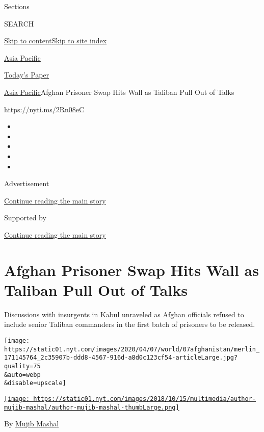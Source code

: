 Sections

SEARCH

\protect\hyperlink{site-content}{Skip to
content}\protect\hyperlink{site-index}{Skip to site index}

\href{https://www.nytimes.com/section/world/asia}{Asia Pacific}

\href{https://myaccount.nytimes.com/auth/login?response_type=cookie\&client_id=vi}{}

\href{https://www.nytimes.com/section/todayspaper}{Today's Paper}

\href{/section/world/asia}{Asia Pacific}\textbar{}Afghan Prisoner Swap
Hits Wall as Taliban Pull Out of Talks

\url{https://nyti.ms/2Rn08eC}

\begin{itemize}
\item
\item
\item
\item
\item
\end{itemize}

Advertisement

\protect\hyperlink{after-top}{Continue reading the main story}

Supported by

\protect\hyperlink{after-sponsor}{Continue reading the main story}

\hypertarget{afghan-prisoner-swap-hits-wall-as-taliban-pull-out-of-talks}{%
\section{Afghan Prisoner Swap Hits Wall as Taliban Pull Out of
Talks}\label{afghan-prisoner-swap-hits-wall-as-taliban-pull-out-of-talks}}

Discussions with insurgents in Kabul unraveled as Afghan officials
refused to include senior Taliban commanders in the first batch of
prisoners to be released.

\texttt{[image: https://static01.nyt.com/images/2020/04/07/world/07afghanistan/merlin\_171145764\_2c35907b-ddd8-4567-916d-a8d0c123cf54-articleLarge.jpg?quality=75\\\&auto=webp\\\&disable=upscale]}

\href{https://www.nytimes.com/by/mujib-mashal}{\texttt{[image: https://static01.nyt.com/images/2018/10/15/multimedia/author-mujib-mashal/author-mujib-mashal-thumbLarge.png]}}

By \href{https://www.nytimes.com/by/mujib-mashal}{Mujib Mashal}

